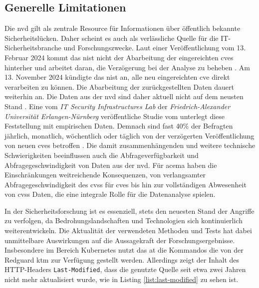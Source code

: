 \subsection{Generelle Limitationen}
\label{limitation-generell}
\par Die \gls{nvd} gilt als zentrale Resource für Informationen über öffentlich bekannte Sicherheitslücken. Daher scheint es auch als verlässliche Quelle für die IT-Sicherheitsbranche und Forschungszwecke. Laut einer Veröffentlichung vom 13. Februar 2024 kommt das \gls{nist} nicht der Abarbeitung der eingereichten \glspl{cve} hinterher und arbeitet daran, die Verzögerung bei der Analyse zu beheben \autocite{NVDProgramAnnouncement}. Am 13. November 2024 kündigte das \gls{nist} an, alle neu eingereichten \gls{cve} direkt verarbeiten zu können. Die Abarbeitung der zurückgestellten Daten dauert weiterhin an. Die Daten aus der \gls{nvd} sind daher aktuell  nicht auf dem neusten Stand \autocite{NationalVulnerabilityDatabase2024}. Eine vom \textit{IT Security Infrastructures Lab} der \textit{Friedrich-Alexander Universität Erlangen-Nürnberg} veröffentliche Studie vom  unterlegt diese Feststellung mit empirischen Daten. Demnach sind fast 40\% der Befragten jährlich, monatlich, wöchentlich oder täglich von der verzögerten Veröffentlichung von neuen \glspl{cve} betroffen \autocite{wunderNVDUsersAttitudes2024}. Die damit zusammenhängenden und weitere technische Schwierigkeiten beeinflussen auch die Abfrageverfügbarkeit und Abfragegeschwindigkeit von Daten aus der \gls{nvd}. Für \gls{acema} haben die Einschränkungen weitreichende Konsequenzen, von verlangsamter Abfragegeschwindigkeit des \gls{cvss} für \glspl{cve} bis hin zur vollständigen Abwesenheit von \gls{cvss} Daten, die eine integrale Rolle für die Datenanalyse spielen.
%
\par In der Sicherheitsforschung ist es essenziell, stets den neuesten Stand der Angriffe zu verfolgen, da Bedrohungslandschaften und Technologien sich kontinuierlich weiterentwickeln. Die Aktualität der verwendeten Methoden und Tests hat dabei unmittelbare Auswirkungen auf die Aussagekraft der Forschungsergebnisse. Insbesondere im Bereich Kubernetes nutzt das \gls{at} die Kommandos die von der Redguard \gls{ktm} zur Verfügung gestellt werden. Allerdings zeigt der Inhalt des HTTP-Headers \verb|Last-Modified|, dass die genutzte Quelle seit etwa zwei Jahren nicht mehr aktualisiert wurde, wie in Listing \ref{list:last-modified} zu sehen ist.


